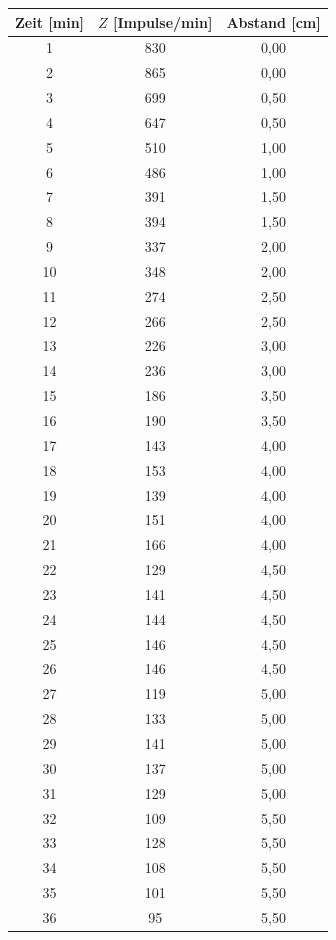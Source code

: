 \documentclass[fontsize=12pt]{scrartcl}
\begin{document}
\begin{figure}[h!]
\begin{minipage}{0.5\textwidth}
\begin{tabular}{|c|c|c|}
Zeit [min]			&	$Z$ [Impulse/min]	&Abstand [cm] \\ \hline
1						&830		&0,00  \\ \hline
2						&865		&0,00  \\ \hline
3						&699		&0,50 \\ \hline
4						&647		&0,50 \\ \hline
5						&510		&1,00 \\ \hline
6						&486		&1,00 \\ \hline
7						&391		&1,50 \\ \hline
8						&394		&1,50 \\ \hline
9						&337		&2,00 \\ \hline
10					&348		&2,00 \\ \hline
11						&274		&2,50 \\ \hline
12					&266		&2,50 \\ \hline
13					&226		&3,00 \\ \hline
14					&236		&3,00 \\ \hline
15					&186		&3,50 \\ \hline
16					&190		&3,50 \\ \hline
17					&143		&4,00 \\ \hline
18					&153		&4,00 \\ \hline
19					&139		&4,00 \\ \hline
20					&151		&4,00 \\ \hline
21					&166		&4,00 \\ \hline
22					&129		&4,50 \\ \hline
23					&141		&4,50 \\ \hline
24					&144		&4,50 \\ \hline
25					&146		&4,50 \\ \hline
26					&146		&4,50 \\ \hline
27					&119		&5,00 \\ \hline
28					&133		&5,00 \\ \hline
29					&141		&5,00 \\ \hline
30					&137		&5,00 \\ \hline
31					&129		&5,00 \\ \hline
32					&109		&5,50 \\ \hline
33					&128		&5,50 \\ \hline
34					&108		&5,50 \\ \hline
35					&101		&5,50 \\ \hline
36					&95			&5,50 \\ \hline
\end{tabular} \\
\end{minipage}
\end{figure}
\end{document}

